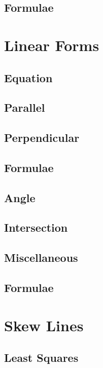 \documentclass[journal]{IEEEtran}
\begin{document}
\subsection{Formulae}

\newpage
\section{Linear Forms}
\subsection{Equation }

\subsection{Parallel}

\subsection{Perpendicular}

\subsection{Formulae}

\subsection{Angle}

\subsection{Intersection}

\subsection{Miscellaneous }

\subsection{Formulae}

\newpage
\section{Skew Lines}
\subsection{Least Squares}

\end{document}
